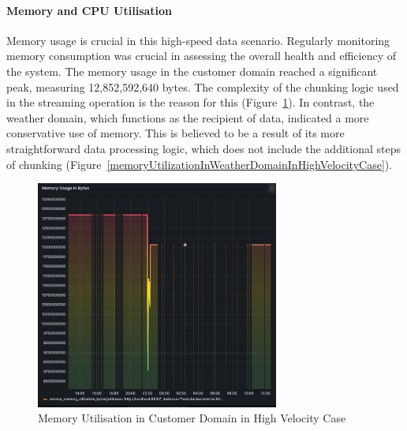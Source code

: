 \documentclass{ieeeaccess}
\begin{document}
\paragraph{Memory and CPU Utilisation} Memory usage is crucial in this high-speed data scenario. Regularly monitoring memory consumption was crucial in assessing the overall health and efficiency of the system. The memory usage in the customer domain reached a significant peak, measuring 12,852,592,640 bytes. The complexity of the chunking logic used in the streaming operation is the reason for this (Figure~\ref{memoryUtilizationInCustomerDomainInHighVelocityCase}). In contrast, the weather domain, which functions as the recipient of data, indicated a more conservative use of memory. This is believed to be a result of its more straightforward data processing logic, which does not include the additional steps of chunking (Figure~\ref{memoryUtilizationInWeatherDomainInHighVelocityCase}).

\begin{figure}[h]

  \centering

  \includegraphics[width=8cm]{images/memory-utilization-in-customer-domain-in-streaming-case.png}

  \caption{Memory Utilisation in Customer Domain in High Velocity Case}

  \label{memoryUtilizationInCustomerDomainInHighVelocityCase}

\end{figure}
\end{document}
